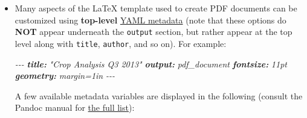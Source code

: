 \documentclass[
  a4paper,
  twoside,
  openright]{book}
\newenvironment{Shaded}{\begin{snugshade}}{\end{snugshade}}
\newcommand{\AnnotationTok}[1]{\textcolor[rgb]{0.56,0.35,0.01}{\textbf{\textit{#1}}}}
\newcommand{\CommentTok}[1]{\textcolor[rgb]{0.56,0.35,0.01}{\textit{#1}}}
\theoremstyle{definition}
\theoremstyle{definition}
\theoremstyle{definition}
\theoremstyle{definition}
\theoremstyle{remark}
\begin{document}
\begin{itemize}
\item
  Many aspects of the LaTeX template used to create PDF documents can be customized using {\textbf{top-level}} \href{https://bookdown.org/yihui/rmarkdown/pdf-document.html\#tab:latex-vars}{YAML metadata} (note that these options do {\textbf{NOT}} appear underneath the \texttt{output} section, but rather appear at the top level along with \texttt{title}, \texttt{author}, and so on). For example:

\begin{Shaded}
\begin{Highlighting}[]
\CommentTok{{-}{-}{-}}
\AnnotationTok{title:}\CommentTok{ "Crop Analysis Q3 2013"}
\AnnotationTok{output:}\CommentTok{ pdf\_document}
\AnnotationTok{fontsize:}\CommentTok{ 11pt}
\AnnotationTok{geometry:}\CommentTok{ margin=1in}
\CommentTok{{-}{-}{-}}
\end{Highlighting}
\end{Shaded}

  A few available metadata variables are displayed in the following (consult the Pandoc manual for \href{https://pandoc.org/MANUAL.html\#variables-for-latex}{the full list}):


\end{itemize}
\end{document}
